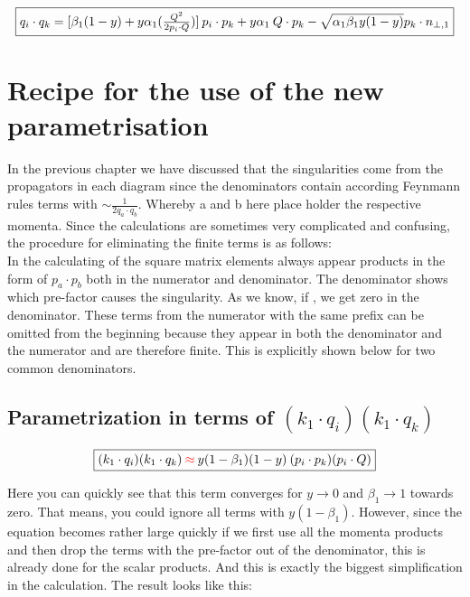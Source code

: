\begin{equation}
	\begin{aligned}
		\fbox{$  q_i \cdot q_k = [\beta_1 (1-y)+y\alpha_1(\frac{Q^2}{2p_i \cdot Q})]\:p_i \cdot p_k+y\alpha_1\:Q\cdot p_k-\sqrt{\alpha_1\beta_1y(1-y)} p_k \cdot {n_{\bot,1}} $}
    \end{aligned}
\end{equation}
\section{Recipe for the use of the new parametrisation}
In the previous chapter we have discussed that the singularities come from the propagators in each diagram since the denominators contain according Feynmann rules terms with $\sim \frac{1}{2 q_a \cdot q_b}  $. Whereby a and b here place holder the respective momenta. Since the calculations are sometimes very complicated and confusing, the procedure for eliminating the finite terms is as follows:\\
In the calculating of the square matrix elements always appear products in the form of $ p_a \cdot p_b $ both in the numerator and denominator.
The denominator shows which pre-factor causes the singularity. As we know, if , we get zero in the denominator. These terms from the numerator with the same prefix can be omitted from the beginning because they appear in both the denominator and the numerator and are therefore finite. This is explicitly shown below for two common denominators.
\subsection{Parametrization in terms of $ (k_1 \cdot q_i )(k_1 \cdot q_k) $} 

\begin{equation}
	\begin{aligned}
		\fbox{$  (k_1 \cdot q_i )(k_1 \cdot q_k) {\color[RGB]{255,0,0} \: \approx\:} y(1-\beta_1) (1-y)\:(p_i \cdot p_k)(p_i \cdot Q) $}
    \end{aligned}
\end{equation}

Here you can quickly see that this term converges for 
$ y \rightarrow 0 $  and $ {\beta}_1 \rightarrow 1 $ towards zero. That means, you could ignore all terms with $  y(1-\beta_1)$. However, since the equation becomes rather large quickly if we first use all the momenta products and then drop the terms with the pre-factor out of the denominator, this is already done for the scalar products. And this is exactly the biggest simplification in the calculation. 
The result looks like this:


